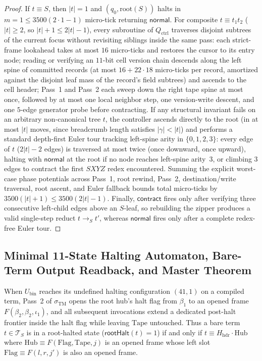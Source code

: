 \documentclass[11pt,reqno]{amsart}
\numberwithin{equation}{section}
\theoremstyle{plain}
\theoremstyle{definition}
\theoremstyle{remark}
\newcommand{\TS}{\mathcal{T}_S}
\newcommand{\redS}{\to_S}
\begin{document}
\begin{proof}
If $t \equiv S$, then $|t| = 1$ and $(q_0, \mathrm{root}(S))$ halts in $m = 1 \le 3500(2\cdot 1 - 1)$ micro-tick returning $\mathsf{normal}$. For composite $t \equiv t_1 t_2$ ($|t| \ge 2$, so $|t| + 1 \le 2|t| - 1$), every subroutine of $Q_{\mathrm{ctrl}}$ traverses disjoint subtrees of the current focus without revisiting siblings inside the same pass: each strict-frame lookahead takes at most $16$ micro-ticks and restores the cursor to its entry node; reading or verifying an $11$-bit cell version chain descends along the left spine of committed records (at most $16 + 22\cdot 18$ micro-ticks per record, amortized against the disjoint leaf mass of the record's field subtrees) and ascends to the cell header; Pass~1 and Pass~2 each sweep down the right tape spine at most once, followed by at most one local neighbor step, one version-write descent, and one $5$-edge generator probe before contracting. If any structural invariant fails on an arbitrary non-canonical tree $t$, the controller ascends directly to the root (in at most $|t|$ moves, since breadcrumb length satisfies $|\gamma| < |t|$) and performs a standard depth-first Euler tour tracking left-spine arity in $\{0,1,2,3\}$: every edge of $t$ ($2|t| - 2$ edges) is traversed at most twice (once downward, once upward), halting with $\mathsf{normal}$ at the root if no node reaches left-spine arity~$3$, or climbing $3$ edges to contract the first $S X Y Z$ redex encountered. Summing the explicit worst-case phase potentials across Pass~1, root rewind, Pass~2, destination/write traversal, root ascent, and Euler fallback bounds total micro-ticks by $3500(|t| + 1) \le 3500(2|t| - 1)$. Finally, $\mathsf{contract}$ fires only after verifying three consecutive left-child edges above an $S$-leaf, so rebuilding the zipper produces a valid single-step reduct $t \redS t'$, whereas $\mathsf{normal}$ fires only after a complete redex-free Euler tour.
\end{proof}

\subsection{Minimal 11-State Halting Automaton, Bare-Term Output Readback, and Master Theorem}\label{subsec:tm-master}

When $U_{\mathrm{bin}}$ reaches its undefined halting configuration $(41, 1)$ on a compiled term, Pass~2 of $\sigma_{\mathrm{TM}}$ opens the root hub's halt flag from $\beta_1$ to an opened frame $F(\beta_2, \beta_2, \iota_1)$, and all subsequent invocations extend a dedicated post-halt frontier inside the halt flag while leaving $\mathrm{Tape}$ untouched. Thus a bare term $t \in \TS$ is in a root-halted state ($\mathsf{rootHalt}(t) = 1$) if and only if $t \equiv H_{\mathrm{hdr}} \cdot \mathrm{Hub}$ where $\mathrm{Hub} \equiv F(\mathrm{Flag}, \mathrm{Tape}, j)$ is an opened frame whose left slot $\mathrm{Flag} \equiv F(l, r, j')$ is also an opened frame.
\end{document}
